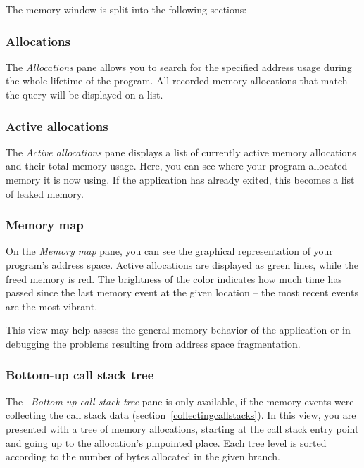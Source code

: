 \documentclass[hidelinks,titlepage,a4paper,twoside]{article}
\begin{document}
The memory window is split into the following sections:

\subsubsection{Allocations}

The \emph{\faAt{} Allocations} pane allows you to search for the specified address usage during the whole lifetime of the program. All recorded memory allocations that match the query will be displayed on a list.

\subsubsection{Active allocations}

The \emph{\faHeartPulse{} Active allocations} pane displays a list of currently active memory allocations and their total memory usage. Here, you can see where your program allocated memory it is now using. If the application has already exited, this becomes a list of leaked memory.

\subsubsection{Memory map}

On the \emph{\faMap{} Memory map} pane, you can see the graphical representation of your program's address space. Active allocations are displayed as green lines, while the freed memory is red. The brightness of the color indicates how much time has passed since the last memory event at the given location -- the most recent events are the most vibrant.

This view may help assess the general memory behavior of the application or in debugging the problems resulting from address space fragmentation.

\subsubsection{Bottom-up call stack tree}
\label{callstacktree}

The \emph{\faTree{}~Bottom-up call stack tree} pane is only available, if the memory events were collecting the call stack data (section~\ref{collectingcallstacks}). In this view, you are presented with a tree of memory allocations, starting at the call stack entry point and going up to the allocation's pinpointed place. Each tree level is sorted according to the number of bytes allocated in the given branch.
\end{document}
